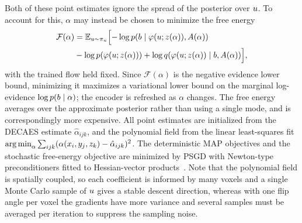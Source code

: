 Both of these point estimates ignore the spread of the posterior over $u$.
To account for this, $\alpha$ may instead be chosen to minimize the free energy
\begin{align}\label{eqn:apx:flip_angle_elbo}
    \mathcal{F}(\alpha) & = \mathbb{E}_{u \sim \pi_{u}} \Bigl[ -\log p(b \mid \varphi(u; z(\alpha)), A(\alpha)) \nonumber \\
                        & - \log p(\varphi(u; z(\alpha))) + \log q(\varphi(u; z(\alpha)) \mid b, A(\alpha)) \Bigr],
\end{align}
with the trained flow held fixed.
Since $\mathcal{F}(\alpha)$ is the negative evidence lower bound, minimizing it maximizes a variational lower bound on the marginal log-evidence $\log p(b \mid \alpha)$; the encoder is refreshed as $\alpha$ changes.
The free energy averages over the approximate posterior rather than using a single mode, and is correspondingly more expensive.
All point estimates are initialized from the \gls*{DECAES} estimate $\hat{\alpha}_{ijk}$, and the polynomial field from the linear least-squares fit $\operatorname{arg\,min}_{\alpha} \sum_{ijk} (\alpha(x_i, y_j, z_k) - \hat{\alpha}_{ijk})^2$.
The deterministic \gls*{MAP} objectives and the stochastic free-energy objective are minimized by \textsc{PSGD} with Newton-type preconditioners fitted to Hessian-vector products~\citep{li_preconditioned_2018}.
Note that the polynomial field is spatially coupled, so each coefficient is informed by many voxels and a single Monte Carlo sample of $u$ gives a stable descent direction, whereas with one flip angle per voxel the gradients have more variance and several samples must be averaged per iteration to suppress the sampling noise.

